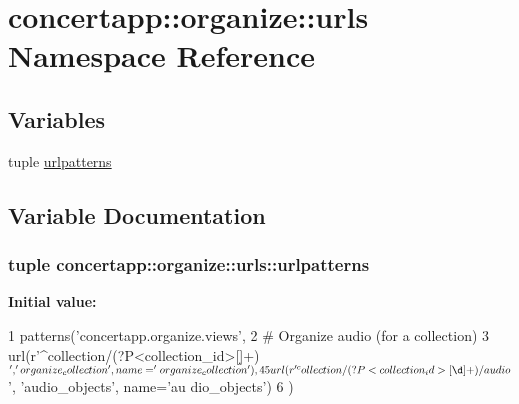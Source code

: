 \hypertarget{namespaceconcertapp_1_1organize_1_1urls}{
\section{concertapp::organize::urls Namespace Reference}
\label{namespaceconcertapp_1_1organize_1_1urls}
}
\subsection*{Variables}
\begin{DoxyCompactItemize}
\item 
tuple \hyperlink{namespaceconcertapp_1_1organize_1_1urls_a52b1d0353daf6134c1abd34569059309}{urlpatterns}
\end{DoxyCompactItemize}


\subsection{Variable Documentation}
\hypertarget{namespaceconcertapp_1_1organize_1_1urls_a52b1d0353daf6134c1abd34569059309}{
\subsubsection[{urlpatterns}]{\setlength{\rightskip}{0pt plus 5cm}tuple {\bf concertapp::organize::urls::urlpatterns}}}
\label{namespaceconcertapp_1_1organize_1_1urls_a52b1d0353daf6134c1abd34569059309}
{\bfseries Initial value:}
\begin{DoxyCode}
1 patterns('concertapp.organize.views',
2     #   Organize audio (for a collection)
3     url(r'^collection/(?P<collection_id>[\d]+)$', 'organize_collection', name='or
      ganize_collection'),
4     
5     url(r'^collection/(?P<collection_id>[\d]+)/audio$', 'audio_objects', name='au
      dio_objects')
6 )
\end{DoxyCode}
